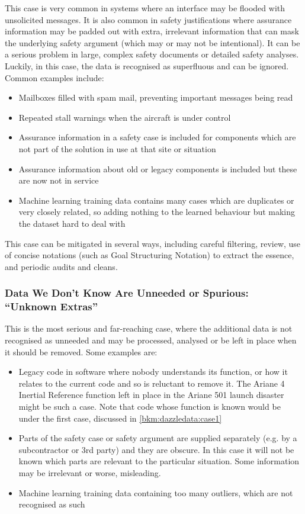 This case is very common in systems where an interface may be flooded with unsolicited messages.
It is also common in  safety justifications where assurance \gls{information} may be padded out with extra, irrelevant \gls{information} that can mask the underlying safety argument (which may or may not be intentional).
It can be a serious problem in large, complex safety documents or detailed safety analyses.
Luckily, in this case, the data is recognised as superfluous and can be ignored.
Common examples include:
\begin{itemize}
    \item Mailboxes filled with spam mail, preventing important messages being read
    \item Repeated stall warnings when the aircraft is under control
    \item Assurance \gls{information} in a safety case is included for components which are not part of the solution in use at that site or situation
    \item Assurance \gls{information} about old or legacy components is included but these are now not in service
    \item Machine learning training data contains many cases which are duplicates or very closely related, so adding nothing to the learned behaviour but making the \gls{dataset} hard to deal with
\end{itemize}
This case can be mitigated in several ways, including careful filtering, review, use of concise  notations (such as Goal Structuring Notation) to extract the essence, and periodic audits and cleans.

\subsubsection{Data We Don’t Know Are Unneeded or Spurious: ``Unknown Extras''}
This is the most serious and far-reaching case, where the additional data is not recognised as unneeded and may be processed, analysed or be left in place when it should be removed. Some examples are:
\begin{itemize}
\item Legacy code in software where nobody understands its function, or how it relates to the current code and so is reluctant to remove it. The Ariane 4 Inertial Reference function left in place in the Ariane 501 launch disaster might be such a case. Note that code whose function is known would be under the first case, discussed in \ref{bkm:dazzledata:case1}
    \item Parts of the safety case or safety argument are supplied separately (e.g. by a subcontractor or 3rd party) and they are obscure. In this case it will not be known which parts are relevant to the particular situation. Some \gls{information} may be irrelevant or worse, misleading.
    \item Machine learning training data containing too many outliers, which are not recognised as such
\end{itemize}

